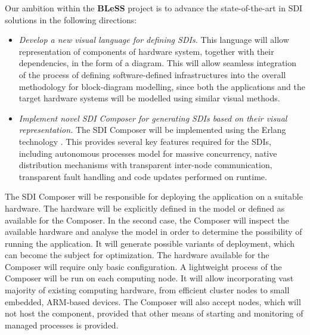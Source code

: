 \documentclass[a4paper,11pt]{article}
\newcommand{\project}[1]{\textbf{#1}\xspace}
\newcommand{\BLESS}{\project{BLeSS}}
\newcommand{\TheProject}{\BLESS}
\begin{document}
Our ambition within the \TheProject{} project is to advance the state-of-the-art in SDI solutions in the following directions: 
\begin{itemize}
\item \emph{Develop a new visual language for defining SDIs.}  This language will allow representation of components of hardware system, together with their dependencies, in the form of a diagram. This will allow seamless integration of the process of defining software-defined infrastructures into the overall methodology for block-diagram modelling, since both the applications and the target hardware systems will be modelled using similar visual methods. 
	
\item \emph{Implement novel SDI Composer for generating SDIs based on their visual representation.} The SDI Composer will be implemented using the Erlang technology \cite{Cesarini:2009}. This provides several key features required for the SDIs, including autonomous processes model for massive concurrency, native distribution mechanisms with transparent inter-node communication, transparent fault handling and code updates performed on runtime. 

\end {itemize} 


The SDI Composer will be responsible for deploying the application on a suitable hardware.  The hardware will be explicitly defined in the model or defined as available for the Composer. In the second case, the Composer will inspect the available hardware and analyse the model in order to determine the possibility of running the application. It will generate possible variants of deployment, which can become the subject for optimization. The hardware available for the Composer will require only basic configuration. A lightweight process of the Composer will be run on each computing node. It will allow incorporating vast majority of existing computing hardware, from efficient cluster nodes to small embedded, ARM-based devices. The Composer will also accept nodes, which will not host the component, provided that other means of starting and monitoring of managed processes is provided.  
\end{document}
